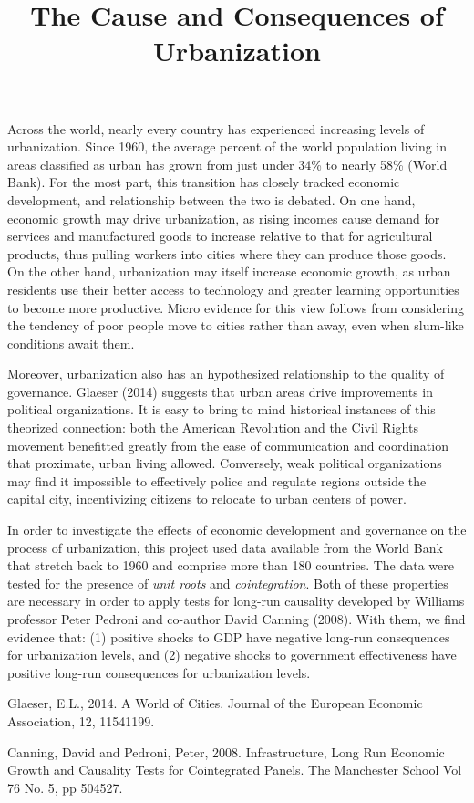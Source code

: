 \documentclass[12pt]{article}
\title{The Cause and Consequences of Urbanization}
\begin{document}
Across the world, nearly every country has experienced increasing levels of urbanization. Since 1960, the average percent of the world population living in areas classified as urban has grown from just under 34\% to nearly 58\% (World Bank). For the most part, this transition has closely tracked economic development, and relationship between the two is debated. On one hand, economic growth may drive urbanization, as rising incomes cause demand for services and manufactured goods to increase relative to that for agricultural products, thus pulling workers into cities where they can produce those goods. On the other hand, urbanization may itself increase economic growth, as urban residents use their better access to technology and greater learning opportunities to become more productive. Micro evidence for this view follows from considering the tendency of poor people move to cities rather than away, even when slum-like conditions await them.

Moreover, urbanization also has an hypothesized relationship to the quality of governance. Glaeser (2014) suggests that urban areas drive improvements in political organizations. It is easy to bring to mind historical instances of this theorized connection: both the American Revolution and the Civil Rights movement benefitted greatly from the ease of communication and coordination that proximate, urban living allowed. Conversely, weak political organizations may find it impossible to effectively police and regulate regions outside the capital city, incentivizing citizens to relocate to urban centers of power.

In order to investigate the effects of economic development and governance on the process of urbanization, this project used data available from the World Bank that stretch back to 1960 and comprise more than 180 countries. The data were tested for the presence of \textit{unit roots} and \textit{cointegration}. Both of these properties are necessary in order to apply tests for long-run causality developed by Williams professor Peter Pedroni and co-author David Canning (2008). With them, we find evidence that: (1) positive shocks to GDP have negative long-run consequences for urbanization levels, and (2) negative shocks to government effectiveness have positive long-run consequences for urbanization levels.

\begin{thebibliography}{9}

Glaeser, E.L., 2014. A World of Cities. Journal of the European Economic Association, 12, 11541199.

Canning, David and Pedroni, Peter, 2008. Infrastructure, Long Run Economic Growth and Causality Tests
for Cointegrated Panels. The Manchester School Vol 76 No. 5, pp 504527.

\end{thebibliography}
\end{document}
